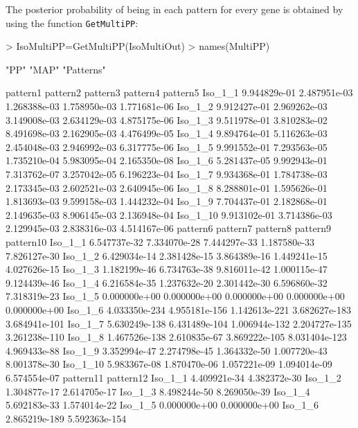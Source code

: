 \documentclass{article}
\begin{document}
\noindent The posterior probability of being in each pattern for every gene is obtained by using the 
function \verb+GetMultiPP+:
\begin{Schunk}
\begin{Sinput}
> IsoMultiPP=GetMultiPP(IsoMultiOut)
> names(MultiPP)
\end{Sinput}
\begin{Soutput}
[1] "PP"       "MAP"      "Patterns"
\end{Soutput}
\begin{Soutput}
             pattern1     pattern2     pattern3     pattern4     pattern5
Iso_1_1  9.944829e-01 2.487951e-03 1.268388e-03 1.758950e-03 1.771681e-06
Iso_1_2  9.912427e-01 2.969262e-03 3.149008e-03 2.634129e-03 4.875175e-06
Iso_1_3  9.511978e-01 3.810283e-02 8.491698e-03 2.162905e-03 4.476499e-05
Iso_1_4  9.894764e-01 5.116263e-03 2.454048e-03 2.946992e-03 6.317775e-06
Iso_1_5  9.991552e-01 7.293563e-05 1.735210e-04 5.983095e-04 2.165350e-08
Iso_1_6  5.281437e-05 9.992943e-01 7.313762e-07 3.257042e-05 6.196223e-04
Iso_1_7  9.934368e-01 1.784738e-03 2.173345e-03 2.602521e-03 2.640945e-06
Iso_1_8  8.288801e-01 1.595626e-01 1.813693e-03 9.599158e-03 1.444232e-04
Iso_1_9  7.704437e-01 2.182868e-01 2.149635e-03 8.906145e-03 2.136948e-04
Iso_1_10 9.913102e-01 3.714386e-03 2.129945e-03 2.838316e-03 4.514167e-06
              pattern6      pattern7      pattern8      pattern9     pattern10
Iso_1_1   6.547737e-32  7.334070e-28  7.444297e-33  1.187580e-33  7.826127e-30
Iso_1_2   6.429034e-14  2.381428e-15  3.864389e-16  1.449241e-15  4.027626e-15
Iso_1_3   1.182199e-46  6.734763e-38  9.816011e-42  1.000115e-47  9.124439e-46
Iso_1_4   6.216584e-35  1.237632e-20  2.301442e-30  6.596860e-32  7.318319e-23
Iso_1_5   0.000000e+00  0.000000e+00  0.000000e+00  0.000000e+00  0.000000e+00
Iso_1_6  4.033350e-234 4.955181e-156 1.142613e-221 3.682627e-183 3.684941e-101
Iso_1_7  5.630249e-138 6.431489e-104 1.006944e-132 2.204727e-135 3.261238e-110
Iso_1_8  1.467526e-138  2.610835e-67 3.869222e-105 8.031404e-123  4.969433e-88
Iso_1_9   3.352994e-47  2.274798e-45  1.364332e-50  1.007720e-43  8.001378e-30
Iso_1_10  5.983367e-08  1.870470e-06  1.057221e-09  1.094014e-09  6.574554e-07
             pattern11     pattern12
Iso_1_1   4.409921e-34  4.382372e-30
Iso_1_2   1.304877e-17  2.614705e-17
Iso_1_3   8.498244e-50  8.269050e-39
Iso_1_4   5.692183e-33  1.574014e-22
Iso_1_5   0.000000e+00  0.000000e+00
Iso_1_6  2.865219e-189 5.592363e-154

\end{Soutput}
\end{Schunk}
\end{document}
